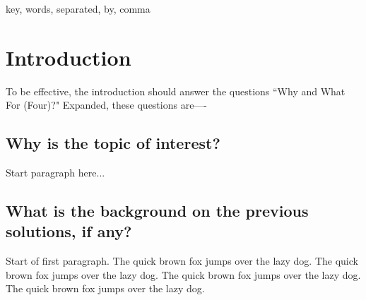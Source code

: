 \documentclass[journal]{./IEEE/IEEEtran}
\title{\SPTITLE}
\author{\ADVISEE~and~\ADVISER%
\REMARK
}
\begin{document}
\maketitle

\begin{abstract}

This article explores the role and importance of roommates in college students' \textit{in UPLB} development, from the initial adaptation in the roommate setting, to their grades and life after college. We highlight the importance of finding the proper roommates and propose a solution in the form of a web application to help UPLB students find the proper roommates for their college life. This solution also extends itself to solve the \textit{dorm-finding} problem we experience.
\end{abstract}

\begin{keywords}
key, words, separated, by, comma
\end{keywords}

\section{Introduction}
To be effective, the introduction should answer the questions ``Why and What For (Four)?" Expanded, these questions are----

\subsection{Why is the topic of interest?}
Start paragraph here...

\subsection{What is the background on the previous solutions, if any?}
Start of first paragraph. The quick brown fox jumps over the lazy dog. The quick
brown fox jumps over the lazy dog. The quick brown fox jumps over the lazy dog. The
quick brown fox jumps over the lazy dog.
\end{document}
